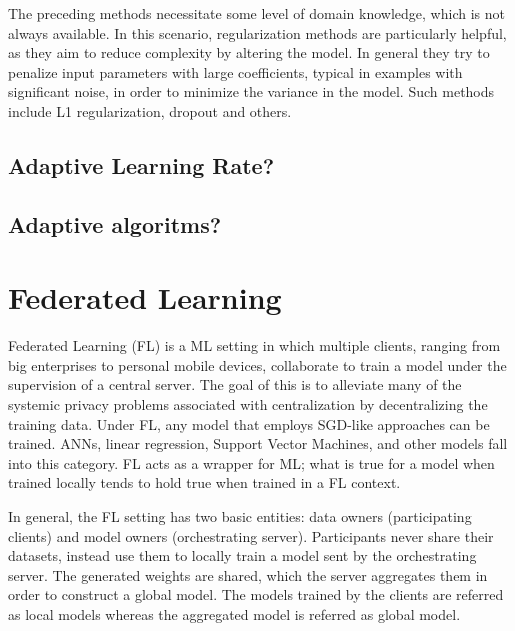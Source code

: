 The preceding methods necessitate some level of domain knowledge, which is not always available. In this scenario, regularization methods are particularly helpful, as they aim to reduce complexity by altering the model. In general they try to penalize input parameters with large coefficients, typical in examples with significant noise, in order to minimize the variance in the model. Such methods include L1 regularization, dropout and others.

\subsection{Adaptive Learning Rate?}
\subsection{Adaptive algoritms?}
\section{Federated Learning}
Federated Learning \cite{FL-original-paper, FL_comprehensive_survey} (FL) is a ML setting in which multiple clients, ranging from big enterprises to personal mobile devices, collaborate to train a model under the supervision of a central server. The goal of this is to alleviate many of the systemic privacy problems associated with centralization by decentralizing the training data. Under FL, any model that employs SGD-like approaches can be trained. ANNs, linear regression, Support Vector Machines, and other models fall into this category. FL acts as a wrapper for ML; what is true for a model when trained locally tends to hold true when trained in a FL context.

In general, the FL setting has two basic entities: data owners (participating clients) and model owners (orchestrating server). Participants never share their datasets, instead use them to locally train a model sent by the orchestrating server. The generated weights are shared, which the server aggregates them in order to construct a global model. The models trained by the clients are referred as local models whereas the aggregated model is referred as global model.

